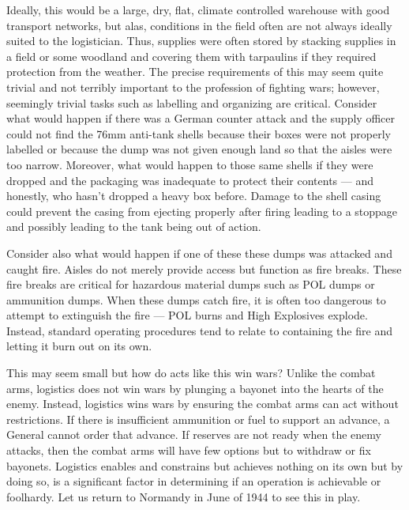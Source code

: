 \documentclass[noraggedright]{turabian-researchpaper}
\begin{document}
Ideally, this would be a large, dry, flat, 
climate controlled warehouse with good transport networks, but alas, 
conditions in the field often are not always ideally suited to the 
logistician.  Thus, supplies were often stored by stacking supplies in a 
field or some woodland and covering them with tarpaulins if they required
protection from the weather.  The precise requirements of this may seem quite
trivial and not terribly important to the profession of fighting wars; however, 
seemingly trivial tasks such as labelling and organizing are critical.  
Consider what would happen if there was a German counter attack and the supply
officer could not find the 76mm anti-tank shells because their boxes were
not properly labelled or because the dump was not given enough land so that 
the aisles were too narrow.  Moreover, what would happen to those same shells 
if they were dropped and the packaging was inadequate to protect their contents
--- and honestly, who hasn't dropped a heavy box before.  Damage to the shell
casing could prevent the casing from ejecting properly after firing leading to
a stoppage and possibly leading to the tank being out of action.  

Consider also what would happen if one of these these dumps was attacked and
caught fire.  Aisles do not merely provide access but function as fire breaks.
These fire breaks are critical for hazardous material dumps such as POL dumps
or ammunition dumps.  When these dumps catch fire, it is often too dangerous
to attempt to extinguish the fire --- POL burns and High Explosives explode.
Instead, standard operating procedures tend to relate to containing the fire
and letting it burn out on its own.  %

This may seem small but how do acts like this win wars?  Unlike the combat 
arms, logistics does not win wars by plunging a bayonet into the hearts of the
enemy.   
Instead, logistics wins wars by ensuring the combat arms can act without 
restrictions.  If there is insufficient ammunition or fuel to support an 
advance, a General cannot order that advance.  If reserves are not ready when
the enemy attacks, then the combat arms will have few options but to withdraw
or fix bayonets.  
Logistics enables and constrains but achieves nothing on its own but by doing
so, is a significant factor in determining if an operation is achievable or
foolhardy.  Let us return to Normandy in June of 1944 to see this in play.
\end{document}
